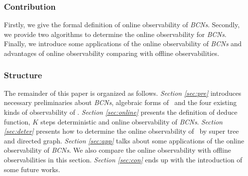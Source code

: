\subsubsection*{Contribution}
Firstly, we give the formal definition of online observability of {\em BCNs}. Secondly, we provide two algorithms to determine the online observability for {\em BCNs}. Finally, we introduce some applications of the online observability of {\em BCNs} and advantages of online observability comparing with offline observabilities. %
\subsubsection*{Structure}
        The remainder of this paper is organized as follows. {\em Section \ref{sec:pre}} introduces necessary preliminaries about {\em BCNs}, algebraic forms of \BCNs\ and the four existing kinds of observability of  \BCNs. {\em Section \ref{sec:online}} presents the definition of deduce function, $K$ steps deterministic and online observability of {\em BCNs}. {\em Section \ref{sec:deter}} presents how to determine the online observability of \BCNs\ by super tree and directed graph. {\em Section \ref{sec:app}} talks about some applications of the online observability of {\em BCNs}. We also compare the online observability with offline observabilities in this section. {\em Section \ref{sec:con}} ends up  with the introduction of some future works.


